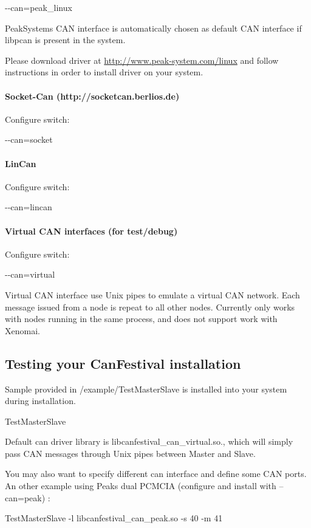 \documentclass[12pt,twoside]{article}
\begin{document}
{\ttfamily
{}-{}-can=peak\_linux}

PeakSystems CAN interface is automatically chosen as default CAN
interface if libpcan is present in the system.

Please download driver at
\href{http://www.peak-system.com/linux}{http://www.peak{}-system.com/linux}
and follow instructions in order to install driver on your system.

\paragraph{Socket{}-Can (http://socketcan.berlios.de)}
Configure switch:

{\ttfamily
{}-{}-can=socket}

\paragraph{LinCan}
Configure switch:

{\ttfamily
{}-{}-can=lincan}

\paragraph{Virtual CAN interfaces (for test/debug)}
Configure switch:

{\ttfamily
{}-{}-can=virtual}

Virtual CAN interface use Unix pipes to emulate a virtual CAN network.
Each message issued from a node is repeat to all other nodes. Currently
only works with nodes running in the same process, and does not support
work with Xenomai.

\subsection{Testing your CanFestival installation}
Sample provided in /example/TestMasterSlave is installed into your
system during installation.

{\ttfamily
TestMasterSlave}

Default can driver library is libcanfestival\_can\_virtual.so., which
will simply pass CAN messages through Unix pipes between Master and
Slave. 

You may also want to specify different can interface and define some CAN
ports. An other example using Peak{\textquotesingle}s dual PCMCIA
(configure and install with {--}can=peak) :

{\ttfamily
TestMasterSlave {}-l libcanfestival\_can\_peak.so {}-s 40 {}-m 41}
\end{document}
